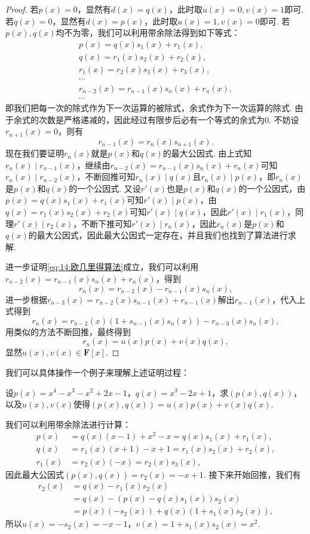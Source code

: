 \begin{proof}
    若$p(x)=0$，显然有$d(x)=q(x)$，此时取$u(x)=0,v(x)=1$即可. 若$q(x)=0$，显然有$d(x)=p(x)$，此时取$u(x)=1,v(x)=0$即可. 若$p(x),q(x)$均不为零，我们可以利用带余除法得到如下等式：
    \begin{gather*}
        p(x)=q(x)s_1(x)+r_1(x),\\
        q(x)=r_1(x)s_2(x)+r_2(x),\\
        r_1(x)=r_2(x)s_3(x)+r_3(x),\\
        \cdots\\
        r_{n-2}(x)=r_{n-1}(x)s_n(x)+r_n(x),\\
        \cdots
    \end{gather*}
    即我们把每一次的除式作为下一次运算的被除式，余式作为下一次运算的除式. 由于余式的次数是严格递减的，因此经过有限步后必有一个等式的余式为$0$. 不妨设$r_{n+1}(x)=0$，则有
    \[r_{n-1}(x)=r_n(x)s_{n+1}(x).\]
    现在我们要证明$r_n(x)$就是$p(x)$和$q(x)$的最大公因式. 由上式知$r_n(x)\mid r_{n-1}(x)$，继续由$r_{n-2}(x)=r_{n-1}(x)s_n(x)+r_n(x)$可知$r_n(x)\mid r_{n-2}(x)$，不断回推可知$r_n(x)\mid q(x)$且$r_n(x)\mid p(x)$，即$r_n(x)$是$p(x)$和$q(x)$的一个公因式. 又设$r'(x)$也是$p(x)$和$q(x)$的一个公因式，由$p(x)=q(x)s_1(x)+r_1(x)$可知$r'(x)\mid p(x)$，由$q(x)=r_1(x)s_2(x)+r_2(x)$可知$r'(x)\mid q(x)$，因此$r'(x)\mid r_1(x)$，同理$r'(x)\mid r_2(x)$，不断下推可知$r'(x)\mid r_n(x)$，因此$r_n(x)$是$p(x)$和$q(x)$的最大公因式，因此最大公因式一定存在，并且我们也找到了算法进行求解.

    进一步证明\autoref{eq:14:欧几里得算法}成立，我们可以利用$r_{n-2}(x)=r_{n-1}(x)s_n(x)+r_n(x)$，得到
    \[r_n(x)=r_{n-2}(x)-r_{n-1}(x)s_n(x),\]
    进一步根据$r_{n-3}(x)=r_{n-2}(x)s_{n-1}(x)+r_{n-1}(x)$解出$r_{n-1}(x)$，代入上式得到
    \[r_n(x)=r_{n-2}(x)(1+s_{n-1}(x)s_n(x))-r_{n-3}(x)s_n(x),\]
    用类似的方法不断回推，最终得到
    \[r_n(x)=u(x)p(x)+v(x)q(x),\]
    显然$u(x),v(x)\in\mathbf{F}[x]$.
\end{proof}

我们可以具体操作一个例子来理解上述证明过程：
\begin{example}
    设$p(x)=x^4-x^3-x^2+2x-1$，$q(x)=x^3-2x+1$，求$(p(x),q(x))$，以及$u(x),v(x)$使得$(p(x),q(x))=u(x)p(x)+v(x)q(x)$.
\end{example}
\begin{solution}
    我们可以利用带余除法进行计算：
    \begin{align*}
        p(x)&=q(x)(x-1)+x^2-x=q(x)s_1(x)+r_1(x),\\
        q(x)&=r_1(x)(x+1)-x+1=r_1(x)s_2(x)+r_2(x),\\
        r_1(x)&=r_2(x)(-x)=r_2(x)s_3(x),
    \end{align*}
    因此最大公因式$(p(x),q(x))=r_2(x)=-x+1$. 接下来开始回推，我们有
    \begin{align*}
        r_2(x)&=q(x)-r_1(x)s_2(x)\\
              &=q(x)-(p(x)-q(x)s_1(x))s_2(x)\\
              &=p(x)(-s_2(x))+q(x)(1+s_1(x)s_2(x)),
    \end{align*}
    所以$u(x)=-s_2(x)=-x-1$，$v(x)=1+s_1(x)s_2(x)=x^2$.
\end{solution}

